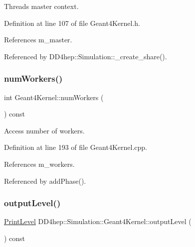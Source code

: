 Thread\textquotesingle{}s master context. 



Definition at line 107 of file Geant4\+Kernel.\+h.



References m\+\_\+master.



Referenced by D\+D4hep\+::\+Simulation\+::\+\_\+create\+\_\+share().

\hypertarget{class_d_d4hep_1_1_simulation_1_1_geant4_kernel_a2ea8899db4b10255c32f7e2e09ad2430}{}\label{class_d_d4hep_1_1_simulation_1_1_geant4_kernel_a2ea8899db4b10255c32f7e2e09ad2430} 
\subsubsection{\texorpdfstring{num\+Workers()}{numWorkers()}}
{\footnotesize\ttfamily int Geant4\+Kernel\+::num\+Workers (\begin{DoxyParamCaption}{ }\end{DoxyParamCaption}) const}



Access number of workers. 



Definition at line 193 of file Geant4\+Kernel.\+cpp.



References m\+\_\+workers.



Referenced by add\+Phase().

\hypertarget{class_d_d4hep_1_1_simulation_1_1_geant4_kernel_aaaddf1d35de3dcb63d569e4ec8a7e4c6}{}\label{class_d_d4hep_1_1_simulation_1_1_geant4_kernel_aaaddf1d35de3dcb63d569e4ec8a7e4c6} 
\subsubsection{\texorpdfstring{output\+Level()}{outputLevel()}}
{\footnotesize\ttfamily \hyperlink{namespace_d_d4hep_a5b5a64d56252469451f2020a27d57d42}{Print\+Level} D\+D4hep\+::\+Simulation\+::\+Geant4\+Kernel\+::output\+Level (\begin{DoxyParamCaption}{ }\end{DoxyParamCaption}) const\hspace{0.3cm}{\ttfamily [inline]}}



